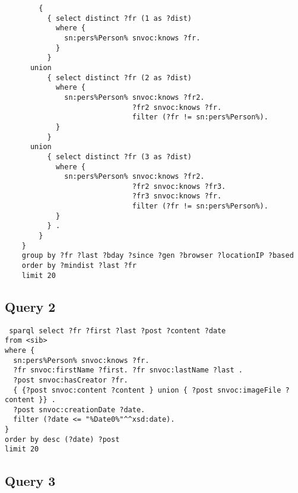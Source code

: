 \begin{verbatim}
        {
          { select distinct ?fr (1 as ?dist)
            where {
              sn:pers%Person% snvoc:knows ?fr.
            }
          }
      union
          { select distinct ?fr (2 as ?dist)
            where {
              sn:pers%Person% snvoc:knows ?fr2. 
                              ?fr2 snvoc:knows ?fr.
                              filter (?fr != sn:pers%Person%).
            }
          }
      union
          { select distinct ?fr (3 as ?dist)
            where {
              sn:pers%Person% snvoc:knows ?fr2. 
                              ?fr2 snvoc:knows ?fr3. 
                              ?fr3 snvoc:knows ?fr. 
                              filter (?fr != sn:pers%Person%).
            }
          } .
        }
    }
    group by ?fr ?last ?bday ?since ?gen ?browser ?locationIP ?based
    order by ?mindist ?last ?fr
    limit 20
\end{verbatim}


 

\subsection{Query 2}

\begin{verbatim}
 sparql select ?fr ?first ?last ?post ?content ?date 
from <sib>
where {
  sn:pers%Person% snvoc:knows ?fr.
  ?fr snvoc:firstName ?first. ?fr snvoc:lastName ?last .
  ?post snvoc:hasCreator ?fr.
  { {?post snvoc:content ?content } union { ?post snvoc:imageFile ?content }} .
  ?post snvoc:creationDate ?date.
  filter (?date <= "%Date0%"^^xsd:date).
}
order by desc (?date) ?post
limit 20
\end{verbatim}


\subsection{Query 3}

